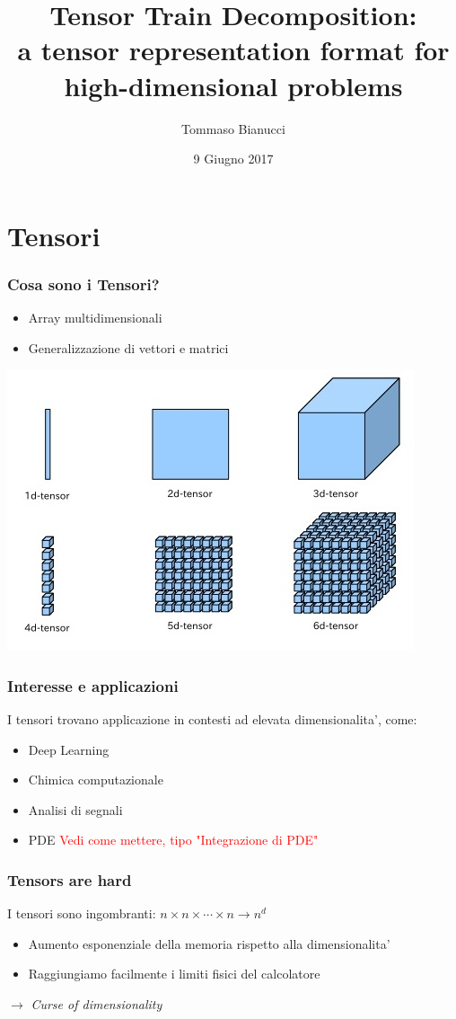 \documentclass{beamer}
\title[]{Tensor Train Decomposition:\\ a tensor representation format for high-dimensional problems}
\author{Tommaso Bianucci}
\date{9 Giugno 2017}
\institute{Università di Pisa}
\newcommand{\nota}[1]{\textcolor{red}{#1}}
\theoremstyle{definition}
\theoremstyle{plain}
\begin{document}
\begin{frame}
\maketitle
\end{frame}

\section{Tensori}
\begin{frame}
\frametitle{Cosa sono i Tensori?}
\begin{itemize}
\item Array multidimensionali
\item Generalizzazione di vettori e matrici
\end{itemize}
\vspace{3mm}
\begin{center}
	\includegraphics[width=.5\textwidth]{Img/tensors.jpg}
\end{center}
\end{frame}

\begin{frame}
\frametitle{Interesse e applicazioni}
I tensori trovano applicazione in contesti ad elevata dimensionalita', come:
\begin{itemize}
\item Deep Learning
\item Chimica computazionale
\item Analisi di segnali
\item PDE \nota{Vedi come mettere, tipo "Integrazione di PDE"}
\end{itemize}
\end{frame}

\begin{frame}
\frametitle{Tensors are hard}
I tensori sono ingombranti: $n \times n \times \cdots \times n \rightarrow n^d$
\begin{itemize}
\item Aumento esponenziale della memoria rispetto alla dimensionalita'
\item Raggiungiamo facilmente i limiti fisici del calcolatore
\end{itemize}

\vspace{5mm}

$\longrightarrow$ \emph{Curse of dimensionality}


\end{frame}	
\end{document}
